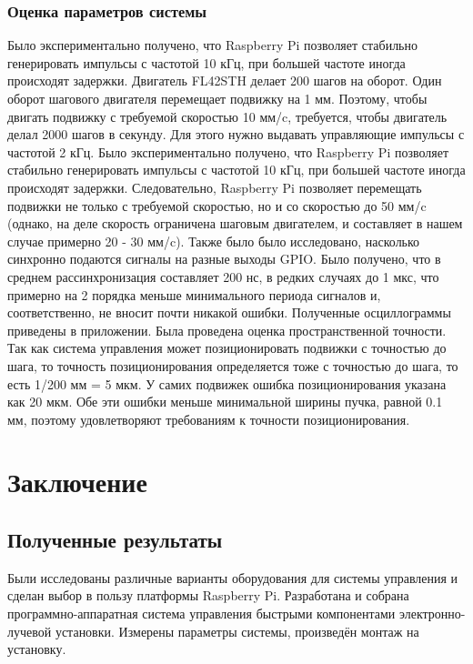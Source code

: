 \documentclass[14pt,russian,a4paper]{extarticle}
\begin{document}
\subsubsection{Оценка параметров системы}
Было экспериментально получено, что Raspberry Pi позволяет стабильно генерировать импульсы с частотой 10 кГц, при большей частоте иногда происходят задержки. Двигатель FL42STH делает 200 шагов на оборот. Один оборот шагового двигателя перемещает подвижку на 1 мм. Поэтому, чтобы двигать подвижку с требуемой скоростью 10 мм/c, требуется, чтобы двигатель делал 2000 шагов в секунду. Для этого нужно выдавать управляющие импульсы с частотой 2 кГц. Было экспериментально получено, что Raspberry Pi позволяет стабильно генерировать импульсы с частотой 10 кГц, при большей частоте иногда происходят задержки. Следовательно, Raspberry Pi позволяет перемещать подвижки не только с требуемой скоростью, но и со скоростью до 50 мм/c (однако, на деле скорость ограничена шаговым двигателем, и составляет в нашем случае примерно 20 - 30 мм/c).
\newline
Также было было исследовано, насколько синхронно подаются сигналы на разные выходы GPIO. Было получено, что в среднем рассинхронизация составляет 200 нс, в редких случаях до 1 мкс, что примерно на 2 порядка меньше минимального периода сигналов и, соответственно, не вносит почти никакой ошибки. Полученные осциллограммы приведены в приложении.
\newline
Была проведена оценка пространственной точности. Так как система управления может позиционировать подвижки с точностью до шага, то точность позиционирования определяется тоже с точностью до шага, то есть 1/200 мм = 5 мкм. У самих подвижек ошибка позиционирования указана как 20 мкм. Обе эти ошибки меньше минимальной ширины пучка, равной 0.1 мм, поэтому удовлетворяют требованиям к точности позиционирования.

\newpage

\section{Заключение}

\subsection{Полученные результаты}
Были исследованы различные варианты оборудования для системы управления и сделан выбор в пользу платформы Raspberry Pi. Разработана и собрана программно-аппаратная система управления быстрыми компонентами электронно-лучевой установки. Измерены параметры системы, произведён монтаж на установку.
\end{document}
